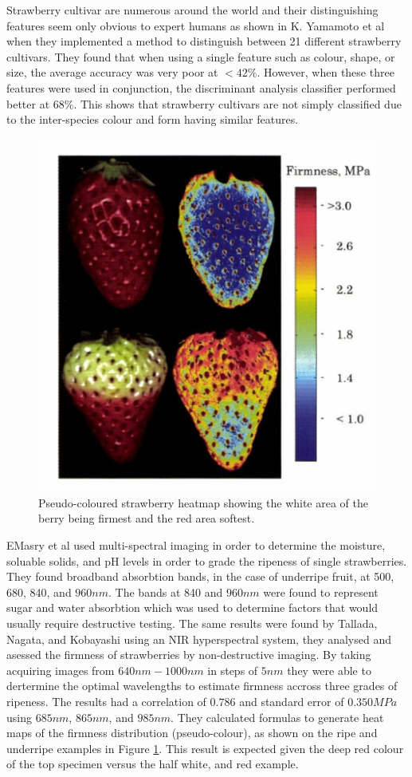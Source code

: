 \documentclass[fleqn,twoside]{article}
\begin{document}
Strawberry cultivar are numerous around the world and their distinguishing features seem only obvious to expert humans as shown in K. Yamamoto et al \cite{yamamoto} when they implemented a method to distinguish between 21 different strawberry cultivars. They found that when using a single feature such as colour, shape, or size, the average accuracy was very poor at $<42\%$. However, when these three features were used in conjunction, the discriminant analysis classifier performed better at $68\%$. This shows that strawberry cultivars are not simply classified due to the inter-species colour and form having similar features. 


\begin{figure}[h]
	\centering
	\includegraphics[width=0.5\linewidth]{multispec_strawberry.png}
	\caption{Pseudo-coloured strawberry heatmap showing the white area of the berry being firmest and the red area softest.}
	\label{fig:multispec_strawberry}
\end{figure}%

EMasry et al \cite{elmasry2} used multi-spectral imaging in order to determine the moisture, soluable solids, and pH levels in order to grade the ripeness of single strawberries. They found broadband absorbtion bands, in the case of underripe fruit, at 500, 680, 840, and $960nm$. The bands at 840 and $960nm$ were found to represent sugar and water absorbtion which was used to determine factors that would usually require destructive testing. The same results were found by Tallada, Nagata, and Kobayashi \cite{tallada} using an NIR hyperspectral system, they analysed and asessed the firmness of strawberries by non-destructive imaging. By taking acquiring images from $640nm-1000nm$ in steps of $5nm$ they were able to dertermine the optimal wavelengths to estimate firmness accross three grades of ripeness. The results had a correlation of $0.786$ and standard error of $0.350MPa$ using $685nm$, $865nm$, and $985nm$. They calculated formulas to generate heat maps of the firmness distribution (pseudo-colour), as shown on the ripe and underripe examples in Figure \ref{fig:multispec_strawberry}. This result is expected given the deep red colour of the top specimen versus the half white, and red example.
\end{document}
